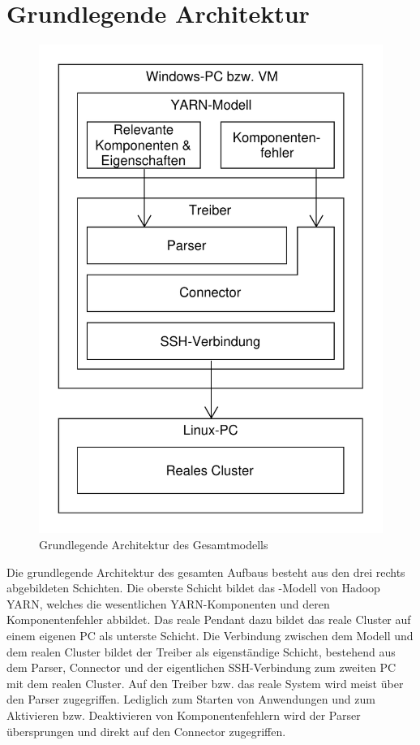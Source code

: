 \section{Grundlegende Architektur}\label{sec:architecture}

\begin{figure}
	\centering
	\includegraphics[width=0.5\columnwidth]{./images/modelArchitecture.pdf}
	\caption{Grundlegende Architektur des Gesamtmodells}
	\label{fig:modelArchitecture}
\end{figure}

Die grundlegende Architektur des gesamten Aufbaus besteht aus den drei rechts abgebildeten Schichten. Die oberste Schicht bildet das \sS-Modell von Hadoop YARN, welches die wesentlichen YARN-Komponenten und deren Komponentenfehler abbildet. Das reale Pendant dazu bildet das reale Cluster auf einem eigenen PC als unterste Schicht. Die Verbindung zwischen dem Modell und dem realen Cluster bildet der Treiber als eigenständige Schicht, bestehend aus dem Parser, Connector und der eigentlichen SSH-Verbindung zum zweiten PC mit dem realen Cluster. Auf den Treiber bzw. das reale System wird meist über den Parser zugegriffen. Lediglich zum Starten von Anwendungen und zum Aktivieren bzw. Deaktivieren von Komponentenfehlern wird der Parser übersprungen und direkt auf den Connector zugegriffen.